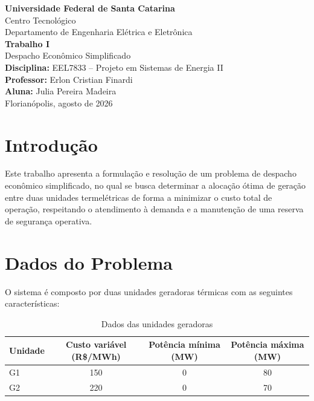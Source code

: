 \documentclass[12pt,a4paper]{article}
\begin{document}
\begin{titlepage}
\centering
\vspace*{2cm}

{\Large\textbf{Universidade Federal de Santa Catarina}}\\[0.3cm]
{\large Centro Tecnológico}\\[0.2cm]
{\large Departamento de Engenharia Elétrica e Eletrônica}\\[2cm]

{\LARGE\textbf{Trabalho I}}\\[0.5cm]
{\Large Despacho Econômico Simplificado}\\[2cm]

{\large\textbf{Disciplina:} EEL7833 -- Projeto em Sistemas de Energia II}\\[0.3cm]
{\large\textbf{Professor:} Erlon Cristian Finardi}\\[2cm]

{\large\textbf{Aluna:} Julia Pereira Madeira}\\[3cm]

{\large Florianópolis, agosto de 2026}

\end{titlepage}

\section{Introdução}

Este trabalho apresenta a formulação e resolução de um problema de despacho econômico simplificado, no qual se busca determinar a alocação ótima de geração entre duas unidades termelétricas de forma a minimizar o custo total de operação, respeitando o atendimento à demanda e a manutenção de uma reserva de segurança operativa.

\section{Dados do Problema}

O sistema é composto por duas unidades geradoras térmicas com as seguintes características:

\begin{table}[H]
\centering
\caption{Dados das unidades geradoras}
\begin{tabular}{@{}lccc@{}}
\toprule
Unidade & Custo variável (R\$/MWh) & Potência mínima (MW) & Potência máxima (MW) \\
\midrule
G1 & 150 & 0 & 80 \\
G2 & 220 & 0 & 70 \\
\bottomrule
\end{tabular}
\end{table}
\end{document}
